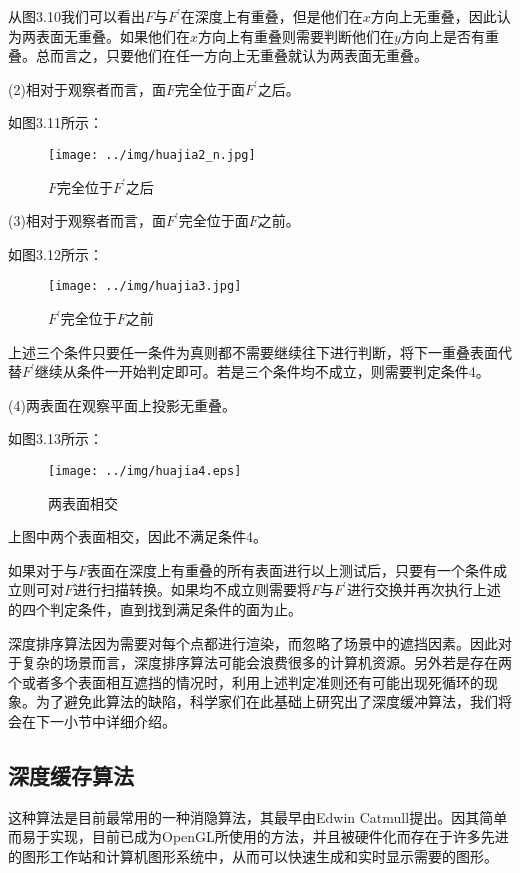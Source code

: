 从图3.10我们可以看出$F$与$F^{'}$在深度上有重叠，但是他们在$x$方向上无重叠，因此认为两表面无重叠。如果他们在$x$方向上有重叠则需要判断他们在$y$方向上是否有重叠。总而言之，只要他们在任一方向上无重叠就认为两表面无重叠。

(2)相对于观察者而言，面$F$完全位于面$F^{'}$之后。

如图3.11所示：
\begin{figure}[htb]
\centering
\texttt{[image: ../img/huajia2\_n.jpg]}
\caption{$F$完全位于$F^{'}$之后}
\label{fig：graph}
\end{figure} 

(3)相对于观察者而言，面$F^{'}$完全位于面$F$之前。

如图3.12所示：
\begin{figure}[htb]
\centering
\texttt{[image: ../img/huajia3.jpg]}
\caption{$F^{'}$完全位于$F$之前}
\label{fig：graph}
\end{figure} 

上述三个条件只要任一条件为真则都不需要继续往下进行判断，将下一重叠表面代替$F^{'}$继续从条件一开始判定即可。若是三个条件均不成立，则需要判定条件4。

(4)两表面在观察平面上投影无重叠。

如图3.13所示：
\begin{figure}[htb]
\centering
\texttt{[image: ../img/huajia4.eps]}
\caption{两表面相交}
\label{fig：graph}
\end{figure} 

上图中两个表面相交，因此不满足条件4。

如果对于与$F$表面在深度上有重叠的所有表面进行以上测试后，只要有一个条件成立则可对$F$进行扫描转换。如果均不成立则需要将$F$与$F^{'}$进行交换并再次执行上述的四个判定条件，直到找到满足条件的面为止。

深度排序算法因为需要对每个点都进行渲染，而忽略了场景中的遮挡因素。因此对于复杂的场景而言，深度排序算法可能会浪费很多的计算机资源。另外若是存在两个或者多个表面相互遮挡的情况时，利用上述判定准则还有可能出现死循环的现象。为了避免此算法的缺陷，科学家们在此基础上研究出了深度缓冲算法，我们将会在下一小节中详细介绍。


\subsection{深度缓存算法}
这种算法是目前最常用的一种消隐算法，其最早由Edwin
Catmull提出。因其简单而易于实现，目前已成为OpenGL所使用的方法，并且被硬件化而存在于许多先进的图形工作站和计算机图形系统中，从而可以快速生成和实时显示需要的图形。

